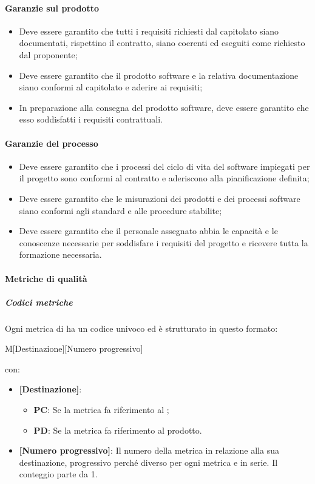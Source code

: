 \paragraph{Garanzie sul prodotto}
\begin{itemize}
    \item Deve essere garantito che tutti i requisiti richiesti dal capitolato siano documentati, rispettino il contratto, siano coerenti ed eseguiti come richiesto dal proponente;
    \item Deve essere garantito che il prodotto software e la relativa documentazione siano conformi al capitolato e aderire ai requisiti;
    \item In preparazione alla consegna del prodotto software, deve essere garantito che esso soddisfatti i requisiti contrattuali.
\end{itemize}

\paragraph{Garanzie del processo}
\begin{itemize}
	\item Deve essere garantito che i processi del ciclo di vita del software impiegati per il progetto sono conformi al contratto e aderiscono alla pianificazione definita;
	\item Deve essere garantito che le misurazioni dei prodotti e dei processi software siano conformi agli standard e alle procedure stabilite;
	\item Deve essere garantito che il personale assegnato abbia le capacità e le conoscenze necessarie per soddisfare i requisiti del progetto e ricevere tutta la formazione necessaria.
\end{itemize}

\paragraph{Metriche di qualità}
\subparagraph*{Codici metriche}\mbox{}
Ogni metrica di  ha un codice univoco ed è strutturato in questo formato:
\begin{center}
    M[Destinazione][Numero progressivo]
\end{center}
con:
\begin{itemize}  
    \item \textbf{[Destinazione]}:
    \begin{itemize}
        \item \textbf{PC}: Se la metrica fa riferimento al ;
        \item \textbf{PD}: Se la metrica fa riferimento al prodotto.
    \end{itemize}
    \item \textbf{[Numero progressivo]}: Il numero della metrica in relazione alla sua destinazione, progressivo perché diverso per ogni metrica e in serie. Il conteggio parte da 1.
\end{itemize}

